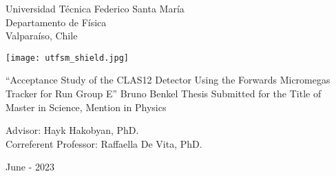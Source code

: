 \begin{titlepage}
\begin{center}
    \noindent
    \fontsize{18}{22}\selectfont Universidad T\'ecnica Federico Santa Mar\'ia \\
    \fontsize{16}{19}\selectfont Departamento de F\'isica \\
    \fontsize{16}{19}\selectfont Valpara\'iso, Chile \\
    \vspace{1.5cm}

    \texttt{[image: utfsm\_shield.jpg]}
    \vspace{1.5cm}

    \fontsize{20}{24}\selectfont ``Acceptance Study of the CLAS12 Detector Using the Forwards Micromegas Tracker for Run Group E''
    \vfill
    \fontsize{16}{19}\selectfont Bruno Benkel
    \vfill
    \fontsize{16}{19}\selectfont Thesis Submitted for the Title of \\ Master in Science, Mention in Physics
    \vspace{1.5cm}

    \fontsize{14}{17}\selectfont Advisor: Hayk Hakobyan, PhD. \\
    \fontsize{14}{17}\selectfont Correferent Professor: Raffaella De Vita, PhD. %
    \vspace{2.5cm}

    \fontsize{14}{17}\selectfont June - 2023
\end{center}
\end{titlepage}

       \pagebreak
 \pagebreak
         \pagebreak
         \pagebreak
\tableofcontents                         \pagebreak
{} {}
\listoffigures                           \pagebreak
